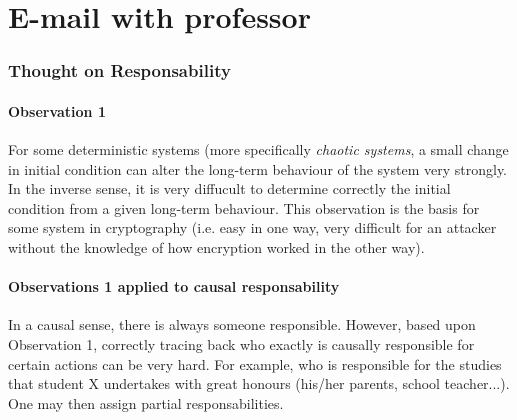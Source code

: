 \documentclass[../main/main.tex]{subfiles}
\begin{document}
\part{E-mail with professor}

\section{Thought on Responsability}

\subsection{Observation 1}
For some deterministic systems (more specifically \textit{chaotic systems}, a small change in initial condition can alter the long-term behaviour of the system very strongly. In the inverse sense, it is very diffucult to determine correctly the initial condition from a given long-term behaviour. This observation is the basis for some system in cryptography (i.e. easy in one way, very difficult for an attacker without the knowledge of how encryption worked in the other way).

\subsection{Observations 1 applied to causal responsability}
\label{observation_causal_respo}
In a causal sense, there is always someone responsible. However, based upon Observation 1, correctly tracing back who exactly is causally responsible for certain actions can be very hard. For example, who is responsible for the studies that student X undertakes with great honours (his/her parents, school teacher...). One may then assign partial responsabilities. 
\end{document}
